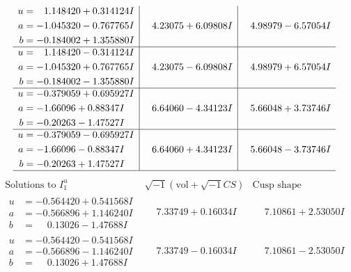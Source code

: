 \documentclass[1p]{elsarticle_modified}
\theoremstyle{definition}
\newcommand{\I}{\sqrt{-1}}
\begin{document}
$$\begin{array}{c|c|c}
\begin{aligned}
u &= \phantom{-}1.148420 + 0.314124 I \\
a &= -1.045320 - 0.767765 I \\
b &= -0.184002 + 1.355880 I\end{aligned}
 & \phantom{-}4.23075 + 6.09808 I & \phantom{-}4.98979 - 6.57054 I \\ \hline\begin{aligned}
u &= \phantom{-}1.148420 - 0.314124 I \\
a &= -1.045320 + 0.767765 I \\
b &= -0.184002 - 1.355880 I\end{aligned}
 & \phantom{-}4.23075 - 6.09808 I & \phantom{-}4.98979 + 6.57054 I \\ \hline\begin{aligned}
u &= -0.379059 + 0.695927 I \\
a &= -1.66096 + 0.88347 I \\
b &= -0.20263 - 1.47527 I\end{aligned}
 & \phantom{-}6.64060 - 4.34123 I & \phantom{-}5.66048 + 3.73746 I \\ \hline\begin{aligned}
u &= -0.379059 - 0.695927 I \\
a &= -1.66096 - 0.88347 I \\
b &= -0.20263 + 1.47527 I\end{aligned}
 & \phantom{-}6.64060 + 4.34123 I & \phantom{-}5.66048 - 3.73746 I\\
 \hline 
 \end{array}$$\newpage$$\begin{array}{c|c|c}  
\text{Solutions to }I^u_{1}& \I (\text{vol} + \sqrt{-1}CS) & \text{Cusp shape}\\
 \hline 
\begin{aligned}
u &= -0.564420 + 0.541568 I \\
a &= -0.566896 + 1.146240 I \\
b &= \phantom{-}0.13026 - 1.47688 I\end{aligned}
 & \phantom{-}7.33749 + 0.16034 I & \phantom{-}7.10861 + 2.53050 I \\ \hline\begin{aligned}
u &= -0.564420 - 0.541568 I \\
a &= -0.566896 - 1.146240 I \\
b &= \phantom{-}0.13026 + 1.47688 I\end{aligned}
 & \phantom{-}7.33749 - 0.16034 I & \phantom{-}7.10861 - 2.53050 I \\ \hline\begin{aligned}

\end{aligned}
\end{array}$$
\end{document}
